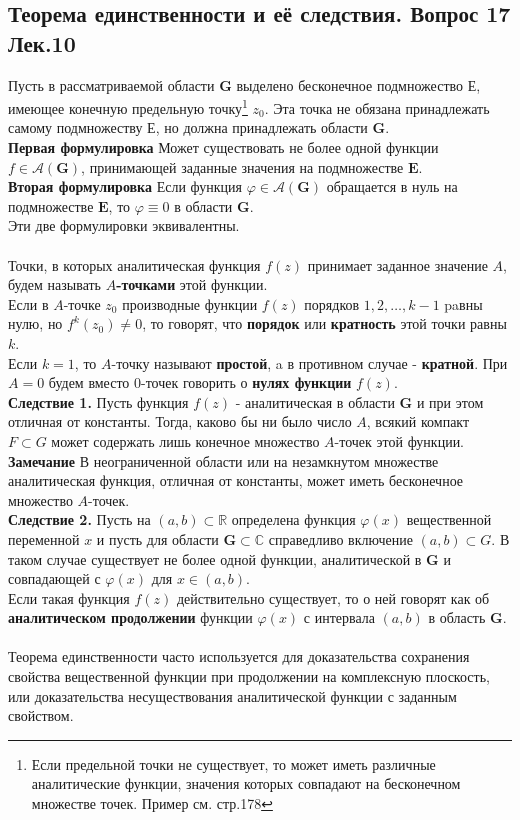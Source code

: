 \documentclass{article}
\begin{document}
\subsection{Теорема единственности и её следствия. Вопрос 17 Лек.10}
	Пусть в рассматриваемой области $\mathbf{G}$ выделено бесконечное подмножество $\mathbf{Е}$, имеющее конечную предельную точку\footnote{Если предельной точки не существует, то может иметь различные аналитические функции, значения которых совпадают на бесконечном множестве точек. Пример см. стр.178} $ z_{0} $. Эта точка не обязана принадлежать самому подмножеству $\mathbf{Е}$, но должна принадлежать области $\mathbf{G}$.\\
	\textbf{Первая формулировка} Может существовать не более одной функции $ f \in \mathcal{A}(\mathbf{G})$, принимающей заданные значения на подмножестве $\mathbf{E}$.\\ 
	\textbf{Вторая формулировка} Если функция $ \varphi \in \mathcal{A}(\mathbf{G}) $ обращается в нуль на подмножестве $\mathbf{E}$, то $ \varphi \equiv 0 $ в области $ \mathbf{G} $.\\
	Эти две формулировки эквивалентны.\\
	\\
	Точки, в которых аналитическая функция $ f(z) $ принимает заданное значение $A$,  будем называть \textbf{$A$-точками} этой функции.\\ Если в $A$-точке ${z}_{0}$ производные функции $ f(z) $ порядков $ 1,2, \ldots, k-1 $ paвны нулю, но $ f^{k}\left(z_{0}\right) \neq 0$, то говорят, что \textbf{порядок} или \textbf{кратность} этой точки равны $ k $. \\
	Если  $k=1$, то $A$-точку называют \textbf{простой}, a в противном случае - \textbf{кратной}. При $A=0$ будем вместо $0$-точек говорить о \textbf{нулях функции} $ f(z) $.\\ 
	\textbf{Следствие 1.} Пусть функция $ f(z)$ - аналитическая в области $ \mathbf{G} $ и при этом отличная от константы. Тогда, каково бы ни было число $A$, всякий компакт $ F \subset G $ может содержать лишь конечное множество $A$-точек этой функции.\\
	\textbf{Замечание} В неограниченной области или на незамкнутом множестве аналитическая функция, отличная от константы, может иметь бесконечное множество $A$-точек.\\
	\textbf{Следствие 2.} Пусть на $ (a, b) \subset \mathbb{R} $ определена функция $ \varphi(x) $ вещественной переменной $ x $ и пусть для области $\mathbf{G} \subset \mathbb{C}$ справедливо включение $ (a, b) \subset G $. В таком случае существует не более одной функции, аналитической в $\mathbf{G}$ и совпадающей с $ \varphi(x) $ для $ x \in(a, b) $. \\
	Если такая функция $ f(z) $ действительно существует, то о ней говорят как об \textbf{аналитическом продолжении} функции $ \varphi(x) $ с интервала $ (a, b) $ в область $\mathbf{G}$.\\
	\\
	Теорема единственности часто используется для доказательства сохранения свойства вещественной функции при продолжении на комплексную плоскость, или доказательства несуществования аналитической функции с заданным свойством.\\ 
\end{document}
